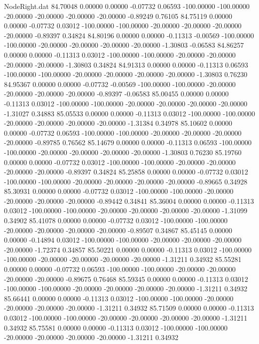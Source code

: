 \begin{filecontents}{NodeRight.dat}
  84.70048    0.00000    0.00000    -0.07732    0.06593 -100.00000 -100.00000  -20.00000  -20.00000  -20.00000  -20.00000   -0.89249    0.76105
  84.75119    0.00000    0.00000    -0.07732    0.03012 -100.00000 -100.00000  -20.00000  -20.00000  -20.00000  -20.00000   -0.89397    0.34824
  84.80196    0.00000    0.00000    -0.11313   -0.00569 -100.00000 -100.00000  -20.00000  -20.00000  -20.00000  -20.00000   -1.30803   -0.06583
  84.86257    0.00000    0.00000    -0.11313    0.03012 -100.00000 -100.00000  -20.00000  -20.00000  -20.00000  -20.00000   -1.30803    0.34824
  84.91313    0.00000    0.00000    -0.11313    0.06593 -100.00000 -100.00000  -20.00000  -20.00000  -20.00000  -20.00000   -1.30803    0.76230
  84.95367    0.00000    0.00000    -0.07732   -0.00569 -100.00000 -100.00000  -20.00000  -20.00000  -20.00000  -20.00000   -0.89397   -0.06583
  85.00455    0.00000    0.00000    -0.11313    0.03012 -100.00000 -100.00000  -20.00000  -20.00000  -20.00000  -20.00000   -1.31027    0.34883
  85.05533    0.00000    0.00000    -0.11313    0.03012 -100.00000 -100.00000  -20.00000  -20.00000  -20.00000  -20.00000   -1.31384    0.34978
  85.10602    0.00000    0.00000    -0.07732    0.06593 -100.00000 -100.00000  -20.00000  -20.00000  -20.00000  -20.00000   -0.89785    0.76562
  85.14679    0.00000    0.00000    -0.11313    0.06593 -100.00000 -100.00000  -20.00000  -20.00000  -20.00000  -20.00000   -1.30803    0.76230
  85.19760    0.00000    0.00000    -0.07732    0.03012 -100.00000 -100.00000  -20.00000  -20.00000  -20.00000  -20.00000   -0.89397    0.34824
  85.25858    0.00000    0.00000    -0.07732    0.03012 -100.00000 -100.00000  -20.00000  -20.00000  -20.00000  -20.00000   -0.89665    0.34928
  85.30931    0.00000    0.00000    -0.07732    0.03012 -100.00000 -100.00000  -20.00000  -20.00000  -20.00000  -20.00000   -0.89442    0.34841
  85.36004    0.00000    0.00000    -0.11313    0.03012 -100.00000 -100.00000  -20.00000  -20.00000  -20.00000  -20.00000   -1.31099    0.34902
  85.41078    0.00000    0.00000    -0.07732    0.03012 -100.00000 -100.00000  -20.00000  -20.00000  -20.00000  -20.00000   -0.89507    0.34867
  85.45145    0.00000    0.00000    -0.14894    0.03012 -100.00000 -100.00000  -20.00000  -20.00000  -20.00000  -20.00000   -1.72374    0.34857
  85.50221    0.00000    0.00000    -0.11313    0.03012 -100.00000 -100.00000  -20.00000  -20.00000  -20.00000  -20.00000   -1.31211    0.34932
  85.55281    0.00000    0.00000    -0.07732    0.06593 -100.00000 -100.00000  -20.00000  -20.00000  -20.00000  -20.00000   -0.89675    0.76468
  85.59345    0.00000    0.00000    -0.11313    0.03012 -100.00000 -100.00000  -20.00000  -20.00000  -20.00000  -20.00000   -1.31211    0.34932
  85.66441    0.00000    0.00000    -0.11313    0.03012 -100.00000 -100.00000  -20.00000  -20.00000  -20.00000  -20.00000   -1.31211    0.34932
  85.71509    0.00000    0.00000    -0.11313    0.03012 -100.00000 -100.00000  -20.00000  -20.00000  -20.00000  -20.00000   -1.31211    0.34932
  85.75581    0.00000    0.00000    -0.11313    0.03012 -100.00000 -100.00000  -20.00000  -20.00000  -20.00000  -20.00000   -1.31211    0.34932
\end{filecontents}
